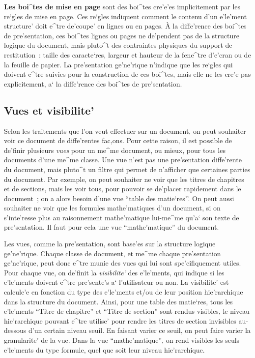 {{\bf Les boi^tes de mise en page} sont des boi^tes cre'e'es implicitement par
les re`gles de mise en page. Ces re`gles indiquent comment le contenu d'un
e'le'ment structure' doit e^tre de'coupe' en lignes ou en pages. \`{A} la
diffe'rence des boi^tes de pre'sentation, ces boi^tes lignes ou pages ne
de'pendent pas de la structure logique du document, mais pluto^t des
contraintes physiques du support de restitution~: taille des caracte`res,
largeur et hauteur de la fene^tre d'e'cran ou de la feuille de
papier. La pre'sentation ge'ne'rique n'indique que les re`gles qui doivent
e^tre suivies pour la construction de ces boi^tes, mais elle ne les cre'e pas
explicitement, a` la diffe'rence des boi^tes de pre'sentation.

\subsection{Vues et visibilite'}

Selon les traitements que l'on veut effectuer sur un document, on peut
souhaiter voir ce document de diffe'rentes fac,ons. Pour cette raison, il est
possible de de'finir plusieurs {\em vues} pour un me^me document, ou mieux,
pour tous les documents d'une me^me classe.
Une vue n'est pas une pre'sentation diffe'rente du document, mais pluto^t
un filtre qui permet de n'afficher que certaines parties du document. Par
exemple, on peut souhaiter ne voir que les titres de chapitres et de
sections, mais les voir tous, pour pouvoir se de'placer rapidement dans le
document~; on a alors besoin d'une vue ``table des matie`res''.
On peut aussi souhaiter ne voir que les formules mathe'matiques d'un document,
si on s'inte'resse plus au raisonnement mathe'matique lui-me^me qu'a` son
texte de pre'sentation. Il faut pour cela une vue ``mathe'matique'' du document.

Les vues, comme la pre'sentation, sont base'es sur la structure logique
ge'ne'rique. Chaque classe de document, et me^me chaque pre'sentation ge'ne'rique,
peut donc e^tre munie des vues qui lui sont spe'cifiquement utiles.
Pour chaque vue, on de'finit la {\em visibilite'} des e'le'ments, qui indique
si les e'le'ments doivent e^tre pre'sente's a` l'utilisateur ou non. La visibilite'
est calcule'e en fonction du type des e'le'ments et/ou de leur position
hie'rarchique dans la structure du document. Ainsi, pour une table des
matie`res, tous les e'le'ments ``Titre de chapitre'' et ``Titre de section''
sont rendus visibles, le niveau hie'rarchique pouvant e^tre utilise' pour
rendre les titres de section invisibles au-dessous d'un certain niveau seuil.
En faisant varier ce seuil, on peut faire varier la granularite' de la vue.
Dans la vue ``mathe'matique'', on rend visibles les seuls e'le'ments du type
formule, quel que soit leur niveau hie'rarchique.

}
